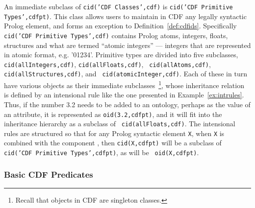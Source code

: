 An immediate subclass of {\tt cid('CDF Classes',cdf)} is {\tt cid('CDF
Primitive Types',cdfpt)}.  This class allows users to maintain in CDF
any legally syntactic Prolog element, and forms an exception to
Definition~\ref{def:cdfids}.  Specifically {\tt cid('CDF Primitive
Types',cdf)} contains Prolog atoms, integers, floats, structures and
what are termed ``atomic integers'' --- integers that are represented
in atomic format, e.g. '01234'.  Primitive types are divided into five
subclasses, {\tt cid(allIntegers,cdf)}, {\tt cid(allFloats,cdf)}, {\tt
cid(allAtoms,cdf)}, {\tt cid(allStructures,cdf)}, and {\tt
cid(atomicInteger,cdf)}.  Each of these in turn have various objects
as their immediate subclasses~\footnote{Recall that objects in CDF are
singleton classes.}, whose inheritance relation is defined by an
intensional rule like the one presented in Example~\ref{ex:intrules}.
Thus, if the number 3.2 needs to be added to an ontology, perhaps as
the value of an attribute, it is represented as {\tt oid(3.2,cdfpt)},
and it will fit into the inheritance hierarchy as a subclass of {\tt
cid(allFloats,cdf)}.  The intensional rules are structured so that for
any Prolog syntactic element {\tt X}, when {\tt X} is combined with
the component , then {\tt cid(X,cdfpt)} will be a
subclass of {\tt cid('CDF Primitive Types',cdfpt)}, as will be {\tt
oid(X,cdfpt)}.

\subsubsection{Basic CDF Predicates}

